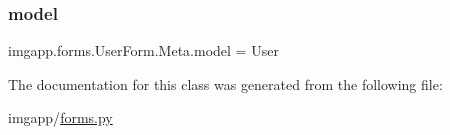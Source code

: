 \mbox{\label{classimgapp_1_1forms_1_1UserForm_1_1Meta_ae646e248a6bf9567c583461a2df4a836}} 
\subsubsection{\texorpdfstring{model}{model}}
{\footnotesize\ttfamily imgapp.\+forms.\+User\+Form.\+Meta.\+model = User\hspace{0.3cm}{\ttfamily [static]}}



The documentation for this class was generated from the following file\+:\begin{DoxyCompactItemize}
\item 
imgapp/\hyperlink{forms_8py}{forms.\+py}\end{DoxyCompactItemize}
